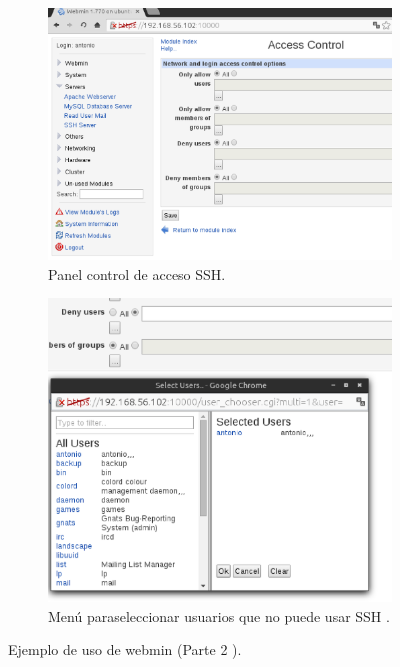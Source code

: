     \begin{figure}[H]
    \centering
     \begin{subfigure}[b]{0.7\textwidth}
        \includegraphics[width=\textwidth]{imagenes/img27.eps}
    \caption{Panel control de acceso SSH.} 
    \label{fig24} 
    \end{subfigure}
    
    \begin{subfigure}[b]{0.7\textwidth}
       \includegraphics[width=\textwidth]{imagenes/img28.eps}
    \caption{Menú paraseleccionar usuarios que no puede usar SSH .} 
    \label{fig25} 
    \end{subfigure}
    \caption{Ejemplo de uso de webmin (Parte 2 ).}  

\end{figure}


